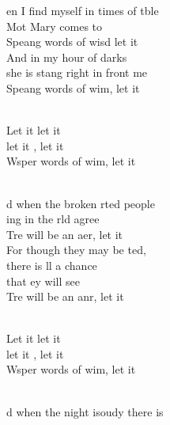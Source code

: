 \begin{cancion}%
	en I find myself in times of tble\\
	Mot Mary comes to \\
	Speang words of wisd let it  \\
	And in my hour of darks\\
	she is stang right in front  me\\
	Speang words of wim, let it  \\\jump\\
	\begin{chorus}%
	Let it  let it \\
	let it , let it \\
	Wsper words of wim, let it \\
	\end{chorus}%
	\jump\\
	d when the broken rted people\\
	ing in the rld agree\\
	Tre will be an aer, let it  \\
	For though they may be ted, \\
	there is ll a chance \\
	that ey will see\\
	Tre will be an anr, let it  \\\jump\\
	\begin{chorus}%
	Let it  let it \\
	let it , let it \\
	Wsper words of wim, let it \\
	\end{chorus}%
	\jump\\
	d when the night isoudy there is\\

\end{cancion}
